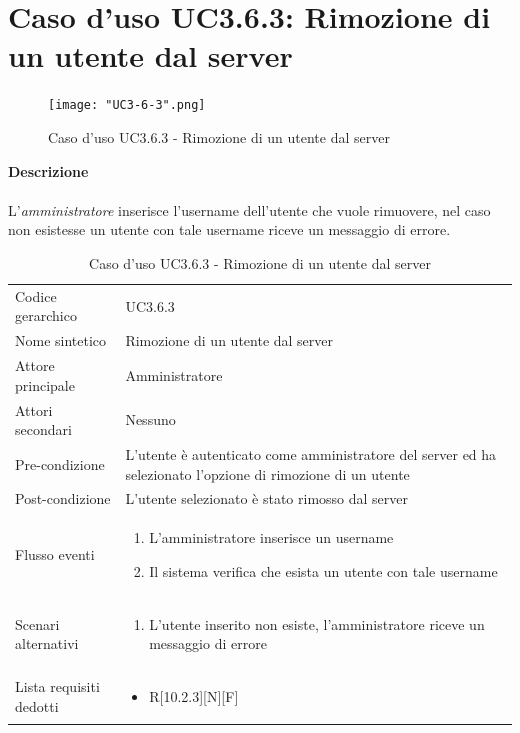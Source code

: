 \documentclass[a4paper]{report}
\begin{document}
	 \section{Caso d'uso UC3.6.3: Rimozione di un utente dal server}
	 \begin{figure}[H]
			\centering
			\texttt{[image: "UC3-6-3".png]}
			\caption{Caso d'uso UC3.6.3 - Rimozione di un utente dal server}
		\end{figure}
	 \textbf{Descrizione} \\ \\
	 L'\emph{amministratore} inserisce l'username dell'utente che vuole rimuovere, nel caso non esistesse
	  un utente con tale username riceve un messaggio di errore. \\
		\begin{table}[H]
		\begin{tabularx}{\textwidth}{X | X}\toprule
			\rowcolor{orange!65}Codice gerarchico & UC3.6.3 \\
			Nome sintetico & Rimozione di un utente dal server \\
			\rowcolor{orange!65}Attore principale & Amministratore\\
			Attori secondari & Nessuno \\
			\rowcolor{orange!65}Pre-condizione & L'utente è autenticato come amministratore del server ed
			 ha selezionato l'opzione di rimozione di un utente\\
			Post-condizione & L'utente selezionato è stato rimosso dal server\\
			\rowcolor{orange!65}Flusso eventi & \begin{enumerate}
			\item L'amministratore inserisce un username
			\item Il sistema verifica che esista un utente con tale username
			\end{enumerate} \\
			Scenari alternativi & \begin{enumerate}
			\item L'utente inserito non esiste, l'amministratore riceve un messaggio di errore
			\end{enumerate} \\
			\rowcolor{orange!65}Lista requisiti dedotti & \begin{itemize}
				\item R[10.2.3][N][F]
				\end{itemize} \\
			\bottomrule
		\end{tabularx}
		\caption{Caso d'uso UC3.6.3 - Rimozione di un utente dal server}
	 \end{table}
\end{document}
